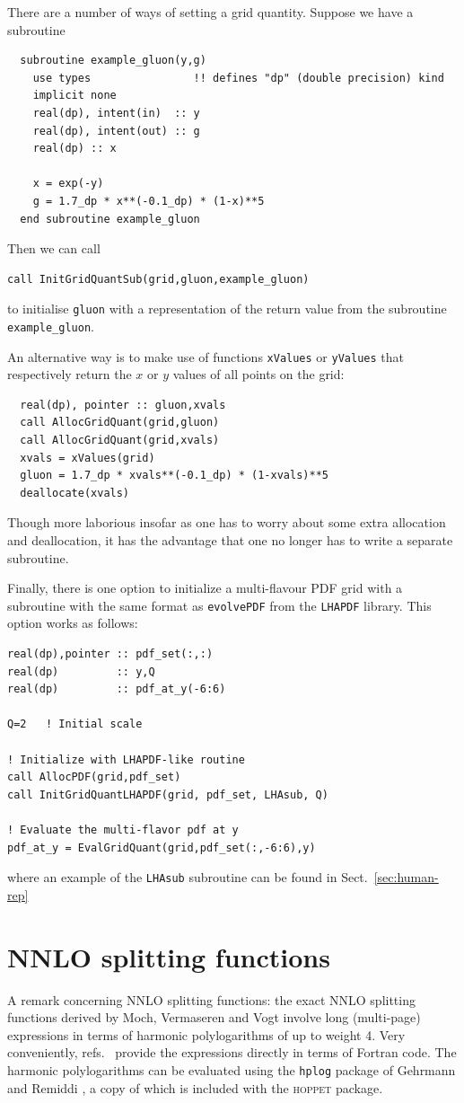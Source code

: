 \documentclass[12pt]{article}
\newcommand{\hoppet}{\textsc{hoppet}\xspace}
\newcommand{\ttt}[1]{\texttt{#1}}
\begin{document}
There are a number of ways of setting a grid quantity. Suppose we have
a subroutine
\begin{lstlisting}
  subroutine example_gluon(y,g)
    use types                !! defines "dp" (double precision) kind
    implicit none
    real(dp), intent(in)  :: y
    real(dp), intent(out) :: g
    real(dp) :: x
    
    x = exp(-y)
    g = 1.7_dp * x**(-0.1_dp) * (1-x)**5 
  end subroutine example_gluon
\end{lstlisting}
Then we can call
\begin{lstlisting}
call InitGridQuantSub(grid,gluon,example_gluon)
\end{lstlisting}
to initialise \texttt{gluon} with a representation of the return value
from the subroutine \texttt{example\_gluon}.

An alternative way is to
make use of functions \texttt{xValues} or \texttt{yValues} that
respectively return the $x$ or $y$ values of all points on the grid:
\begin{lstlisting}
  real(dp), pointer :: gluon,xvals
  call AllocGridQuant(grid,gluon)
  call AllocGridQuant(grid,xvals)
  xvals = xValues(grid)
  gluon = 1.7_dp * xvals**(-0.1_dp) * (1-xvals)**5 
  deallocate(xvals)
\end{lstlisting}
Though more laborious insofar as one has to worry about some extra
allocation and deallocation, it has the advantage that one no longer
has to write a separate subroutine.

Finally, there is one option to initialize a multi-flavour
PDF grid with a subroutine with the same format as
\ttt{evolvePDF} from the \ttt{LHAPDF} library. This
option works as follows:

\begin{lstlisting}
real(dp),pointer :: pdf_set(:,:)
real(dp)         :: y,Q
real(dp)         :: pdf_at_y(-6:6)

Q=2   ! Initial scale

! Initialize with LHAPDF-like routine
call AllocPDF(grid,pdf_set)
call InitGridQuantLHAPDF(grid, pdf_set, LHAsub, Q)

! Evaluate the multi-flavor pdf at y
pdf_at_y = EvalGridQuant(grid,pdf_set(:,-6:6),y)

\end{lstlisting}
where an example of  the \ttt{LHAsub} subroutine can be found in
Sect.~\ref{sec:human-rep}

\section{NNLO splitting functions}
\label{sect:nnlo}
A remark concerning NNLO splitting functions: the exact NNLO splitting
functions derived by Moch, Vermaseren and Vogt
\cite{NNLO-NS,NNLO-singlet} involve long (multi-page) expressions in
terms of harmonic polylogarithms of up to weight 4. Very conveniently,
refs.~\cite{NNLO-NS,NNLO-singlet} provide the expressions directly in
terms of Fortran code.
%
The harmonic polylogarithms can be evaluated using the \ttt{hplog}
package of Gehrmann and Remiddi \cite{FortranPolyLog}, a copy of which
is included with the \hoppet package. 
\end{document}
